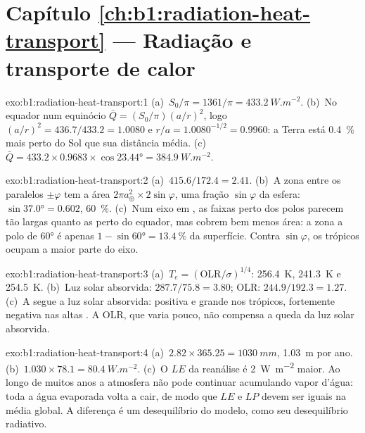\section*{Capítulo \ref{ch:b1:radiation-heat-transport} --- Radiação e transporte de calor}

\begin{solution}{exo:b1:radiation-heat-transport:1}
(a)~$S_0/\pi = 1361/\pi = \qty{433.2}{W.m^{-2}}$. (b)~No equador num equinócio $\bar Q = (S_0/\pi)(a/r)^2$,
logo $(a/r)^2 = 436.7/433.2 = 1.0080$ e $r/a =
1.0080^{-1/2} = 0.9960$: a Terra está \qty{0.4}{\percent} mais perto do Sol que sua distância média.
(c)~$\bar Q = 433.2 \times 0.9683 \times \cos\ang{23.44} =
\qty{384.9}{W.m^{-2}}$.
\end{solution}

\begin{solution}{exo:b1:radiation-heat-transport:2}
(a)~$415.6/172.4 = 2.41$. (b)~A zona entre os paralelos $\pm\varphi$ tem a área $2\pi a_\oplus^2 \times 2\sin\varphi$, uma fração $\sin\varphi$ da esfera: $\sin\ang{37.0} = 0.602$, \qty{60}{\percent}.
(c)~Num eixo em , as faixas perto dos polos parecem tão largas quanto as perto do equador,
mas cobrem bem menos área: a zona a polo de \ang{60} é apenas $1 - \sin\ang{60} =
\qty{13.4}{\percent}$ da superfície. Contra $\sin\varphi$, os trópicos ocupam a maior parte do eixo.
\end{solution}

\begin{solution}{exo:b1:radiation-heat-transport:3}
(a)~$T_e = (\text{OLR}/\sigma)^{1/4}$: \qty{256.4}{K}, \qty{241.3}{K} e \qty{254.5}{K}.
(b)~Luz solar absorvida: $287.7/75.8 = 3.80$; OLR: $244.9/192.3 =
1.27$. (c)~A  segue a luz solar absorvida: positiva e grande nos trópicos,
fortemente negativa nas altas . A OLR, que varia pouco, não compensa a queda da luz solar
absorvida.
\end{solution}

\begin{solution}{exo:b1:radiation-heat-transport:4}
(a)~$2.82 \times 365.25 = \qty{1030}{mm}$, \qty{1.03}{m} por ano. (b)~$1.030 \times
78.1 = \qty{80.4}{W.m^{-2}}$.
(c)~O $LE$ da reanálise é \qty{2}{W.m^{-2}} maior. Ao longo de muitos anos a atmosfera não pode
continuar acumulando vapor d'água: toda a água evaporada volta a cair, de modo que $LE$ e $LP$ devem
ser iguais na média global. A diferença é um desequilíbrio do modelo, como seu desequilíbrio
radiativo.
\end{solution}

